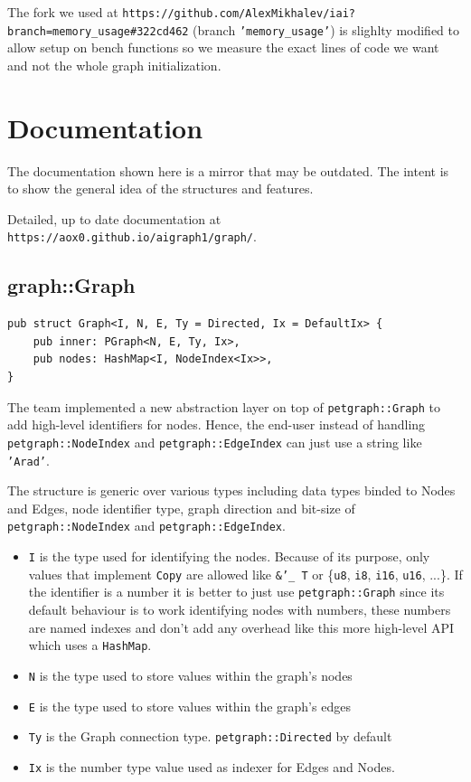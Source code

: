 The fork we used at \texttt{https://github.com/AlexMikhalev/iai?branch=memory\_usage\#322cd462} (branch \texttt{'memory\_usage'}) is slighlty
modified to allow setup on bench functions so we measure the exact lines of code we want and not the whole
graph initialization. \autocite{iai}

\newpage
\section{Documentation}

The documentation shown here is a mirror that may be outdated.
The intent is to show the general idea of the structures and features.

Detailed, up to date documentation at \texttt{https://aox0.github.io/aigraph1/graph/}.

\subsection{graph::Graph}

\begin{verbatim}
pub struct Graph<I, N, E, Ty = Directed, Ix = DefaultIx> {
    pub inner: PGraph<N, E, Ty, Ix>,
    pub nodes: HashMap<I, NodeIndex<Ix>>,
}
\end{verbatim}

The team implemented a new abstraction layer on top of \texttt{petgraph::Graph} to add high-level identifiers for nodes.
Hence, the end-user instead of handling \texttt{petgraph::NodeIndex} and \texttt{petgraph::EdgeIndex} can just use a string like \texttt{'Arad'}.

The structure is generic over various types including data types binded to Nodes and Edges, node identifier type, graph direction and bit-size of
\texttt{petgraph::NodeIndex} and \texttt{petgraph::EdgeIndex}.

\begin{itemize}
 \item \texttt{I} is the type used for identifying the nodes. Because of its purpose, only values that implement
 \texttt{Copy} are allowed like \texttt{\&'\_ T} or \{\texttt{u8}, \texttt{i8}, \texttt{i16}, \texttt{u16}, ...\}.
 If the identifier is a number it is better to just use \texttt{petgraph::Graph} since its default
 behaviour is to work identifying nodes with numbers, these numbers are named indexes and don't add any overhead
 like this more high-level API which uses a \texttt{HashMap}.
 \item \texttt{N} is the type used to store values within the graph's nodes
 \item \texttt{E} is the type used to store values within the graph's edges
 \item \texttt{Ty} is the Graph connection type. \texttt{petgraph::Directed} by default
 \item \texttt{Ix} is the number type value used as indexer for Edges and Nodes.
\end{itemize}

